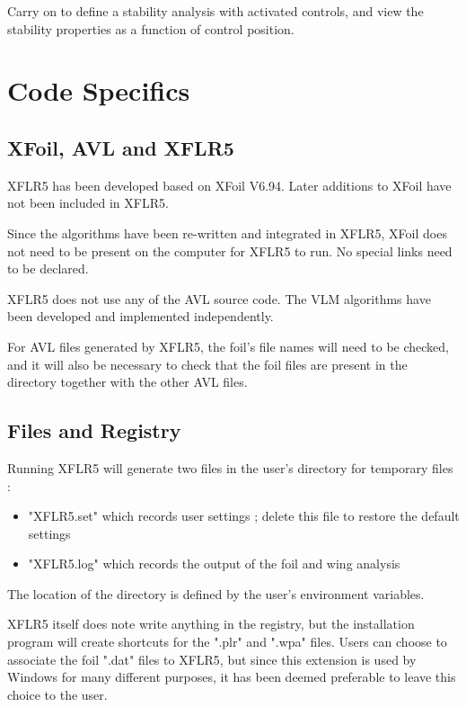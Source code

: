 \documentclass[a4paper,twoside,12pt,dvips]{article}
\begin{document}
Carry on to define a stability analysis with activated controls, and
view the stability properties as a function of control position.

\clearpage

\section{Code Specifics}

\subsection{XFoil, AVL and XFLR5}

XFLR5 has been developed based on XFoil V6.94. Later additions to
XFoil have not been included in XFLR5.

Since the algorithms have been re-written and integrated in XFLR5,
XFoil does not need to be present on the computer for XFLR5 to run. No
special links need to be declared.

XFLR5 does not use any of the AVL source code. The VLM algorithms have
been developed and implemented independently.

For AVL files generated by XFLR5, the foil's file names will need to
be checked, and it will also be necessary to check that the foil files
are present in the directory together with the other AVL files.

\subsection{Files and Registry}

Running XFLR5 will generate two files in the user's directory for
temporary files :

\begin{itemize}
\item "XFLR5.set" which records user settings ; delete this file to
restore the default settings
\item "XFLR5.log" which records the output of the foil and wing
analysis
\end{itemize}

The location of the directory is defined by the user's environment
variables.

XFLR5 itself does note write anything in the registry, but the
installation program will create shortcuts for the ".plr" and
".wpa" files. Users can choose to associate the foil ".dat" files
to XFLR5, but since this extension is used by Windows for many
different purposes, it has been deemed preferable to leave this choice
to the user.
\end{document}
